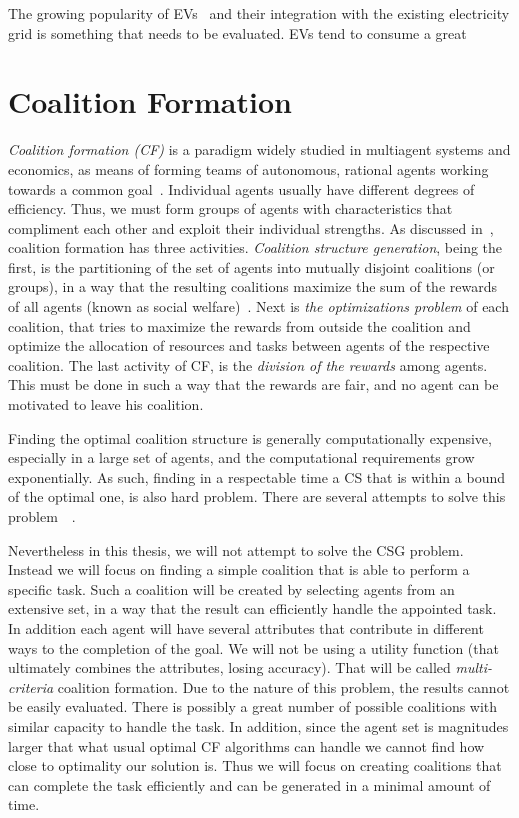 The growing popularity of EVs~\cite{globalev2016} and their integration with the existing electricity grid is something that needs to be evaluated. EVs tend to consume a great

\section{Coalition Formation}
{\em Coalition formation (CF)} is a paradigm widely studied in multiagent systems and economics, as means of forming teams of autonomous, rational agents working towards a common goal~\cite{chalkiadakis2011computational}. Individual agents usually have different degrees of efficiency. Thus, we must form groups of agents with characteristics that compliment each other and exploit their individual strengths\cite{shehory1998methods}.
As discussed in~\cite{sandholm1999coalition}, coalition formation has three activities. {\em Coalition structure generation}, being the first, is the partitioning of the set of agents into mutually disjoint coalitions (or groups), in a way that the resulting coalitions maximize the sum of the rewards of all agents (known as social welfare)~\cite{rahwan2009anytime}. Next is {\em the optimizations problem} of each coalition, that tries to maximize the rewards from outside the coalition and optimize the allocation of resources and tasks between agents of the respective coalition. The last activity of CF, is the {\em division of the rewards} among agents. This must be done in such a way that the rewards are fair, and no agent can be motivated to leave his coalition.

Finding the optimal coalition structure is generally computationally expensive, especially in a large set of agents, and the computational requirements grow exponentially. As such, finding in a respectable time a CS that is within a bound of the optimal one, is also hard problem. There are several attempts to solve this problem~\cite{sandholm1999coalition}~\cite{rahwan2009anytime}.

Nevertheless in this thesis, we will not attempt to solve the CSG problem. Instead we will focus on finding a simple coalition that is able to perform a specific task. Such a coalition will be created by selecting agents from an extensive set, in a way that the result can efficiently handle the appointed task. In addition each agent will have several attributes that contribute in different ways to the completion of the goal. We will not be using a utility function (that ultimately combines the attributes, losing accuracy). That will be called {\em multi-criteria} coalition formation. Due to the nature of this problem, the results cannot be easily evaluated. There is possibly a great number of possible coalitions with similar capacity to handle the task. In addition, since the agent set is magnitudes larger that what usual optimal CF algorithms can handle we cannot find how close to optimality our solution is. Thus we will focus on creating coalitions that can complete the task efficiently and can be generated in a minimal amount of time.

